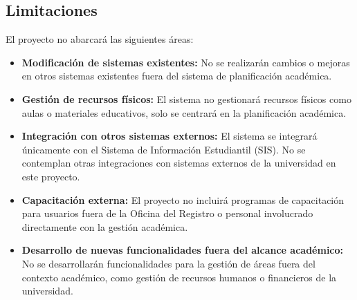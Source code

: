 \subsection{Limitaciones}
El proyecto no abarcará las siguientes áreas:

\begin{itemize}
    \item \textbf{Modificación de sistemas existentes:} No se realizarán cambios o mejoras en otros sistemas existentes fuera del sistema de planificación académica.
    \item \textbf{Gestión de recursos físicos:} El sistema no gestionará recursos físicos como aulas o materiales educativos, solo se centrará en la planificación académica.
    \item \textbf{Integración con otros sistemas externos:} El sistema se integrará únicamente con el Sistema de Información Estudiantil (SIS). No se contemplan otras integraciones con sistemas externos de la universidad en este proyecto.
    \item \textbf{Capacitación externa:} El proyecto no incluirá programas de capacitación para usuarios fuera de la Oficina del Registro o personal involucrado directamente con la gestión académica.
    \item \textbf{Desarrollo de nuevas funcionalidades fuera del alcance académico:} No se desarrollarán funcionalidades para la gestión de áreas fuera del contexto académico, como gestión de recursos humanos o financieros de la universidad.
\end{itemize}
